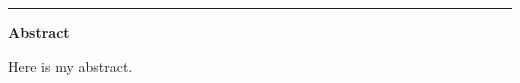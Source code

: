   \thispagestyle{empty}
  \vspace{-1cm}
  \begin{center}
  {\huge \textbf{\thesistitle}}
  \\
  \vspace{0.8cm} {\Large \textbf{\myname}\\\rule{7cm}{0.2mm}}
  \end{center}
  \vspace{0.6cm}
  {\large \textbf{Abstract}}

  Here is my abstract.

  \newpage